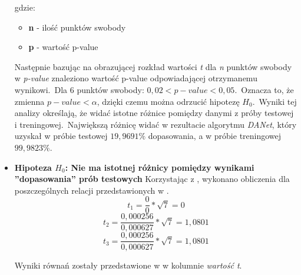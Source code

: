\begin{itemize}
\begin{table}[H]
\begin{tabular}{|c|l|l|l|l|l|l|l|l|l|}
        \end{tabular}
        \label{tab:p-val}
        gdzie:
        \begin{itemize}
            \item \textbf{n} - ilość punktów swobody
            \item \textbf{p} - wartość p-value
        \end{itemize}
    \end{table}
    Następnie bazując na  obrazującej rozkład wartości \textit{t} dla \textit{n} punktów swobody w \textit{p-value} znaleziono wartość p-value odpowiadającej otrzymanemu wynikowi.\ Dla 6 punktów swobody: $0,02 < p-value < 0,05$.\ Oznacza to, że zmienna $p-value < \alpha$, dzięki czemu można odrzucić hipotezę $H_0$.\ Wyniki tej analizy określają, że widać istotne różnice pomiędzy danymi z próby testowej i treningowej.\ Największą różnicę widać w rezultacie algorytmu \textit{DANet}, który uzyskał w próbie testowej $19,9691\%$ dopasowania, a w próbie treningowej $99,9823\%$.\\

    \item \textbf{Hipoteza $H_0$: Nie ma istotnej różnicy pomiędzy wynikami ''dopasowania'' prób testowych}
    Korzystając z , wykonano obliczenia dla poszczególnych relacji przedstawionych w .
    \begin{equation}
        \label{eq:t-p1}
        t_1 = \frac{0}{0} * \sqrt{7} = 0
    \end{equation}
    \begin{equation}
        \label{eq:t-p2}
        t_2 = \frac{0,000256}{0,000627} * \sqrt{7} = 1,0801
    \end{equation}
    \begin{equation}
        \label{eq:t-p3}
        t_3 = \frac{0,000256}{0,000627} * \sqrt{7} = 1,0801
    \end{equation}

    Wyniki równań zostały przedstawione w  w kolumnie \textit{wartość t}.


\end{itemize}
